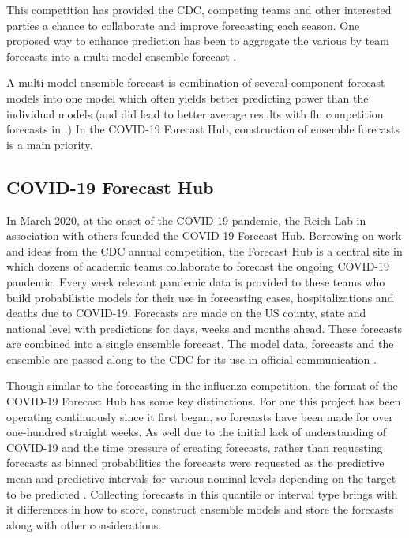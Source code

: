 \documentclass{article}\usepackage[]{graphicx}\usepackage[]{color}
\begin{document}
This competition has provided the CDC, competing teams and other interested
parties a chance to collaborate and improve forecasting each season. One 
proposed way to enhance prediction has been to aggregate the various by team
forecasts into a multi-model ensemble forecast \cite{mcgowan2019collaborative}
\cite{mcandrew2019adaptively} \cite{reich2019accuracy}.

A multi-model ensemble forecast is combination of several component forecast 
models into one model which often yields better predicting power than the 
individual models \cite{cramer2021evaluation} (and did lead to better average 
results with flu competition forecasts in \cite{reich2019accuracy}.) 
In the COVID-19 Forecast Hub, construction of ensemble forecasts is a main
priority.




\subsection{COVID-19 Forecast Hub}
In March 2020, at the onset of the COVID-19 pandemic, the Reich Lab in
association with others founded the COVID-19 Forecast Hub. Borrowing on work and 
ideas from the CDC annual competition, the Forecast Hub is a central site in 
which dozens of academic teams collaborate to forecast the ongoing COVID-19 
pandemic.
Every week relevant
pandemic data is provided to these teams who build probabilistic models for 
their use in
forecasting cases, hospitalizations and deaths due to COVID-19. Forecasts are 
made on the US county,
state and national level with predictions for days, weeks and months ahead.
These forecasts are combined into a single ensemble forecast. The model data,
forecasts and the ensemble are passed along to the CDC for its use in official
communication \cite{Cramer2021-hub-dataset}.

Though similar to the forecasting in the influenza competition, the format of 
the COVID-19 Forecast Hub has some key distinctions. For one this project has
been operating continuously since it first began, so forecasts have been made
for over one-hundred straight weeks. 
As well due to the initial lack of understanding of COVID-19 and the time 
pressure of
creating forecasts, rather than requesting forecasts as binned probabilities
the forecasts were requested as the predictive mean and 
predictive intervals for various nominal levels depending on the target to be
predicted \cite{bracher2021evaluating}. Collecting forecasts in this quantile
or interval type brings with it differences in how to score, construct ensemble
models and store the forecasts along with other considerations.
\end{document}
